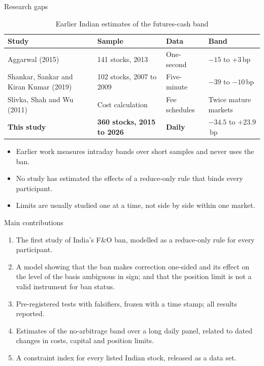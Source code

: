 \documentclass[11pt]{beamer}
\newcommand{\bp}{\,bp}
\begin{document}
\begin{frame}{Research gaps}
  \begin{table}
    \scriptsize
    \caption{Earlier Indian estimates of the futures-cash band}
    \begin{tabular}{@{}p{3.1cm}p{2.5cm}p{2.0cm}p{2.6cm}@{}}
      \toprule
      Study & Sample & Data & Band \\
      \midrule
      Aggarwal (2015) & 141 stocks, 2013 & One-second & $-15$ to $+3$\bp \\
      Shankar, Sankar and Kiran Kumar (2019) & 102 stocks, 2007 to 2009 & Five-minute & $-39$ to $-10$\bp \\
      Slivka, Shah and Wu (2011) & Cost calculation & Fee schedules & Twice mature markets \\
      \textbf{This study} & \textbf{360 stocks, 2015 to 2026} & \textbf{Daily} & $\mathbf{-34.5}$ to $\mathbf{+23.9}$\bp \\
      \bottomrule
    \end{tabular}
  \end{table}
  \begin{itemize}
    \small
    \item Earlier work measures intraday bands over short samples and never uses the ban.
    \item No study has estimated the effects of a reduce-only rule that binds every participant.
    \item Limits are usually studied one at a time, not side by side within one market.
  \end{itemize}
\end{frame}

\begin{frame}{Main contributions}
  \begin{enumerate}
    \item The first study of India's F\&O ban, modelled as a reduce-only rule for every participant.
    \item A model showing that the ban makes correction one-sided and its effect on the level of the basis ambiguous in
    sign; and that the position limit is not a valid instrument for ban status.
    \item Pre-registered tests with falsifiers, frozen with a time stamp; all results reported.
    \item Estimates of the no-arbitrage band over a long daily panel, related to dated changes in costs, capital and
    position limits.
    \item A constraint index for every listed Indian stock, released as a data set.
  \end{enumerate}
\end{frame}
\end{document}
